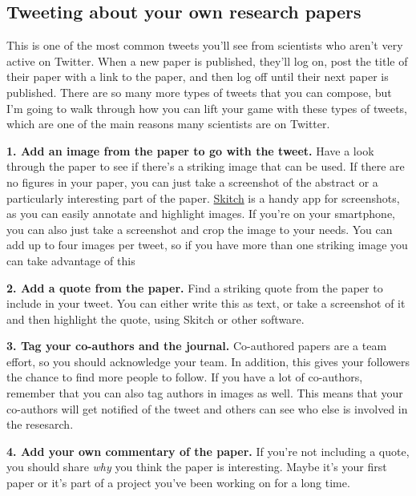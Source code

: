 \documentclass[
]{book}
\begin{document}
\hypertarget{tweeting-about-your-own-research-papers}{%
\subsection{Tweeting about your own research papers}\label{tweeting-about-your-own-research-papers}}

This is one of the most common tweets you'll see from scientists who aren't very active on Twitter. When a new paper is published, they'll log on, post the title of their paper with a link to the paper, and then log off until their next paper is published. There are so many more types of tweets that you can compose, but I'm going to walk through how you can lift your game with these types of tweets, which are one of the main reasons many scientists are on Twitter.

\textbf{1. Add an image from the paper to go with the tweet.} Have a look through the paper to see if there's a striking image that can be used. If there are no figures in your paper, you can just take a screenshot of the abstract or a particularly interesting part of the paper. \href{https://evernote.com/products/skitch}{Skitch} is a handy app for screenshots, as you can easily annotate and highlight images. If you're on your smartphone, you can also just take a screenshot and crop the image to your needs. You can add up to four images per tweet, so if you have more than one striking image you can take advantage of this

\textbf{2. Add a quote from the paper.} Find a striking quote from the paper to include in your tweet. You can either write this as text, or take a screenshot of it and then highlight the quote, using Skitch or other software.

\textbf{3. Tag your co-authors and the journal.} Co-authored papers are a team effort, so you should acknowledge your team. In addition, this gives your followers the chance to find more people to follow. If you have a lot of co-authors, remember that you can also tag authors in images as well. This means that your co-authors will get notified of the tweet and others can see who else is involved in the resesarch.

\textbf{4. Add your own commentary of the paper.} If you're not including a quote, you should share \emph{why} you think the paper is interesting. Maybe it's your first paper or it's part of a project you've been working on for a long time.
\end{document}
